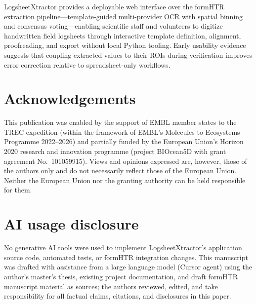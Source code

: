 \documentclass[preprint,12pt,a4paper]{elsarticle}
\begin{document}
LogsheetXtractor provides a deployable web interface over the formHTR extraction pipeline---template-guided multi-provider OCR with spatial binning and consensus voting---enabling scientific staff and volunteers to digitize handwritten field logsheets through interactive template definition, alignment, proofreading, and export without local Python tooling.
Early usability evidence suggests that coupling extracted values to their ROIs during verification improves error correction relative to spreadsheet-only workflows.

\section*{Acknowledgements}
\label{sec:acknowledgements}

This publication was enabled by the support of EMBL member states to the TREC expedition (within the framework of EMBL's Molecules to Ecosystems Programme 2022--2026) and partially funded by the European Union's Horizon 2020 research and innovation programme (project BIOcean5D with grant agreement No.\ 101059915).
Views and opinions expressed are, however, those of the authors only and do not necessarily reflect those of the European Union.
Neither the European Union nor the granting authority can be held responsible for them.

\section*{AI usage disclosure}
\label{sec:ai-disclosure}

No generative AI tools were used to implement LogsheetXtractor's application source code, automated tests, or formHTR integration changes.
This manuscript was drafted with assistance from a large language model (Cursor agent) using the author's master's thesis, existing project documentation, and draft formHTR manuscript material as sources; the authors reviewed, edited, and take responsibility for all factual claims, citations, and disclosures in this paper.
\end{document}
